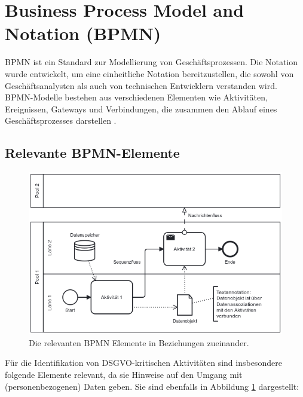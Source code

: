 \section{Business Process Model and Notation (BPMN)}\label{sec:bpmn}

\ac{BPMN} ist ein Standard zur Modellierung von Geschäftsprozessen. Die Notation wurde entwickelt, um eine einheitliche Notation bereitzustellen, die sowohl von Geschäftsanalysten als auch von technischen Entwicklern verstanden wird. \ac{BPMN}-Modelle bestehen aus verschiedenen Elementen wie Aktivitäten, Ereignissen, Gateways und Verbindungen, die zusammen den Ablauf eines Geschäftsprozesses darstellen \cite{omgbpmn}.

\subsection*{Relevante BPMN-Elemente}

\begin{figure}
    \centering
    \includegraphics[width=.65\linewidth]{images/process-models/bpmn-elements-showcase}
    \caption{Die relevanten BPMN Elemente in Beziehungen zueinander.}
    \label{fig:bpmn-elements-showcase}
\end{figure}

Für die Identifikation von \ac{DSGVO}-kritischen Aktivitäten sind insbesondere folgende Elemente relevant, da sie Hinweise auf den Umgang mit (personenbezogenen) Daten geben. Sie sind ebenfalls in Abbildung \ref{fig:bpmn-elements-showcase} dargestellt:

